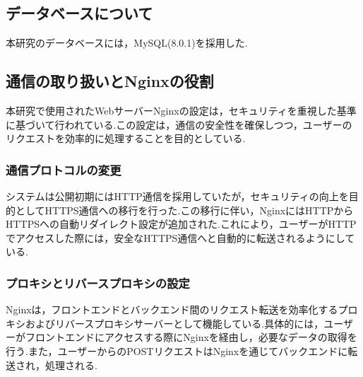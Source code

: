 \documentclass[b5paper,12pt,dvipdfmx]{jsreport}
\begin{document}
\subsection{データベースについて}
本研究のデータベースには，MySQL(8.0.1)を採用した.


\subsection{通信の取り扱いとNginxの役割}
本研究で使用されたWebサーバーNginxの設定は，セキュリティを重視した基準に基づいて行われている.この設定は，通信の安全性を確保しつつ，ユーザーのリクエストを効率的に処理することを目的としている.

\subsubsection{通信プロトコルの変更}
システムは公開初期にはHTTP通信を採用していたが，セキュリティの向上を目的としてHTTPS通信への移行を行った.この移行に伴い，NginxにはHTTPからHTTPSへの自動リダイレクト設定が追加された.これにより，ユーザーがHTTPでアクセスした際には，安全なHTTPS通信へと自動的に転送されるようにしている.

\subsubsection{プロキシとリバースプロキシの設定}
Nginxは，フロントエンドとバックエンド間のリクエスト転送を効率化するプロキシおよびリバースプロキシサーバーとして機能している.具体的には，ユーザーがフロントエンドにアクセスする際にNginxを経由し，必要なデータの取得を行う.また，ユーザーからのPOSTリクエストはNginxを通じてバックエンドに転送され，処理される.

\end{document}
